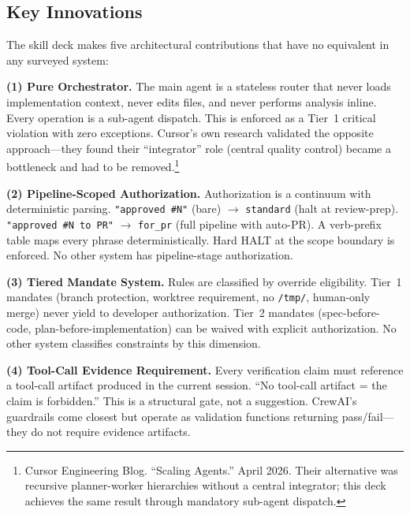 \documentclass[11pt,a4paper]{article}
\begin{document}
\subsection{Key Innovations}

The skill deck makes five architectural contributions that have no equivalent in any surveyed system:

\begin{strengthbox}
\textbf{(1) Pure Orchestrator.}  The main agent is a stateless router that never loads implementation context, never edits files, and never performs analysis inline.  Every operation is a sub-agent dispatch.  This is enforced as a Tier~1 critical violation with zero exceptions.  Cursor's own research validated the opposite approach---they found their ``integrator'' role (central quality control) became a bottleneck and had to be removed.\footnote{Cursor Engineering Blog.  ``Scaling Agents.''  April 2026.  Their alternative was recursive planner-worker hierarchies without a central integrator; this deck achieves the same result through mandatory sub-agent dispatch.}
\end{strengthbox}

\begin{strengthbox}
\textbf{(2) Pipeline-Scoped Authorization.}  Authorization is a continuum with deterministic parsing.  \texttt{"approved \#N"} (bare) $\to$ \texttt{standard} (halt at review-prep).  \texttt{"approved \#N to PR"} $\to$ \texttt{for\_pr} (full pipeline with auto-PR).  A verb-prefix table maps every phrase deterministically.  Hard HALT at the scope boundary is enforced.  No other system has pipeline-stage authorization.
\end{strengthbox}

\begin{strengthbox}
\textbf{(3) Tiered Mandate System.}  Rules are classified by override eligibility.  Tier~1 mandates (branch protection, worktree requirement, no \texttt{/tmp/}, human-only merge) never yield to developer authorization.  Tier~2 mandates (spec-before-code, plan-before-implementation) can be waived with explicit authorization.  No other system classifies constraints by this dimension.
\end{strengthbox}

\begin{strengthbox}
\textbf{(4) Tool-Call Evidence Requirement.}  Every verification claim must reference a tool-call artifact produced in the current session.  ``No tool-call artifact = the claim is forbidden.''  This is a structural gate, not a suggestion.  CrewAI's guardrails come closest but operate as validation functions returning pass/fail---they do not require evidence artifacts.
\end{strengthbox}
\end{document}

